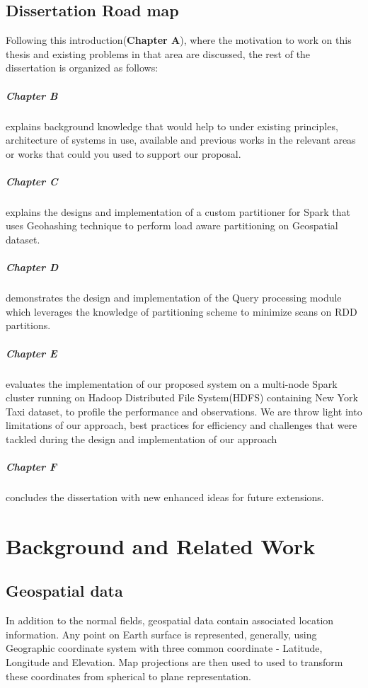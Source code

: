 \documentclass[article,type=msc,colorback,12pt,accentcolor=tud1d]{tudthesis}
\begin{document}
		\hfill
		\subsection{Dissertation Road map}
		
		Following this introduction(\textbf{Chapter A}), where the motivation to work on this thesis and existing problems in that area are discussed, the rest of the dissertation is organized as follows: 
		
		\subparagraph{Chapter B} explains background knowledge that would help to under existing principles, architecture of systems in use, available and previous works in the relevant areas or works that could you used to support our proposal.  
		
		\subparagraph{Chapter C} explains the designs and implementation of a custom partitioner for Spark that uses Geohashing technique to perform load aware partitioning on Geospatial dataset. 
		
		\subparagraph{Chapter D} demonstrates the design and implementation of the Query processing module which leverages the knowledge of partitioning scheme to minimize scans on RDD partitions. 
		
		\subparagraph{Chapter E} evaluates the implementation of our proposed system on a multi-node Spark cluster running on Hadoop Distributed File System(HDFS) containing New York Taxi dataset, to profile the performance and observations. We are throw light into limitations of our approach, best practices for efficiency and challenges that were tackled during the design and implementation of our approach
		
		\subparagraph{Chapter F} concludes the dissertation with new enhanced ideas for future extensions. 
		


	\clearpage

	\hfill
  \section{Background and Related Work}
  \hfill
	  
		   \subsection{Geospatial data }
			   \par In addition to the normal fields, geospatial data contain associated location information. Any point on Earth surface is represented, generally, using Geographic coordinate system with three common coordinate - Latitude, Longitude and Elevation. Map projections are then used to used to transform these coordinates from spherical to plane representation. 
			   
\end{document}
